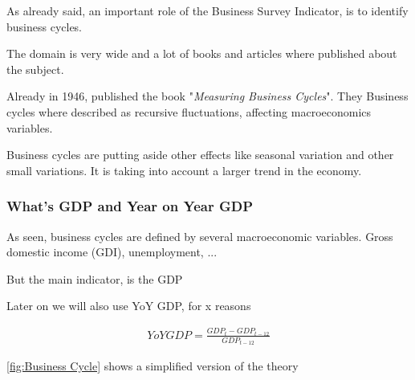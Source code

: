 \documentclass[12pt,a4paper,oneside]{book}
\begin{document}
As already said, an important role of the Business Survey Indicator, is to identify business cycles.


The domain is very wide and a lot of books and articles where published about the subject. 

Already in 1946, \citeauthor{mitchell_measuring_1946} published the book "\textit{Measuring Business Cycles}". They 
Business cycles where described as recursive fluctuations, affecting macroeconomics variables.

Business cycles are putting aside other effects like seasonal variation and other small variations. It is taking into account a larger trend in the economy.

\subsubsection{What's GDP and Year on Year GDP}

As seen, business cycles are defined by several macroeconomic variables. 
Gross domestic income (GDI), unemployment, ...

But the main indicator, is the GDP

Later on we will also use YoY GDP, for x reasons

\begin{eqnarray}
    YoY GDP = \frac{GDP_t - GDP_{t-12}}{GDP_{t-12}} 
\end{eqnarray}

\autoref{fig:Business Cycle} shows a simplified version of the theory
\end{document}
